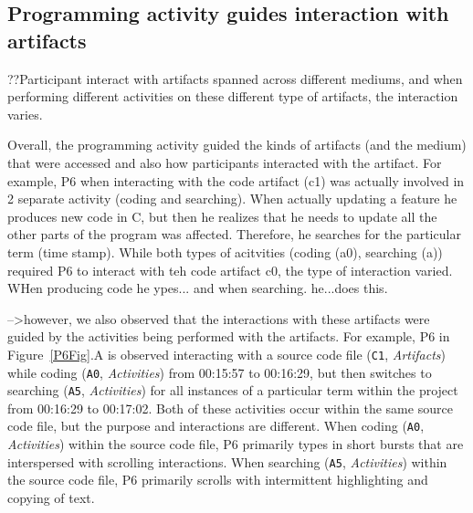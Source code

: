 
\subsection{Programming activity guides interaction with artifacts}


??Participant interact with artifacts spanned across different mediums, and when performing different activities on these different type of artifacts, the interaction varies.

Overall, the programming activity guided the kinds of artifacts (and the medium) that were accessed and also how participants interacted with the artifact. For example, P6 when interacting with the code artifact (c1) was actually involved in 2 separate activity (coding and searching). When actually updating a feature he produces new code in C, but then he realizes that he needs to update all the other parts of the program was affected. Therefore, he searches for the particular term (time stamp). While both types of acitvities (coding (a0), searching (a)) required P6 to interact with teh code artifact c0, the type of interaction varied. WHen producing code he ypes... and when searching. he...does this.

-->however, we also observed that the interactions with these artifacts were guided by the activities being performed with the artifacts. For example, P6 in Figure~\ref{P6Fig}.A is observed interacting with a source code file (\texttt{C1}, \textit{Artifacts}) while coding (\texttt{A0}, \textit{Activities}) from 00:15:57 to 00:16:29, but then switches to searching (\texttt{A5}, \textit{Activities}) for all instances of a particular term within the project from 00:16:29 to 00:17:02. Both of these activities occur within the same source code file, but the purpose and interactions are different. When coding (\texttt{A0}, \textit{Activities}) within the source code file, P6 primarily types in short bursts that are interspersed with scrolling interactions. When searching (\texttt{A5}, \textit{Activities}) within the source code file, P6 primarily scrolls with intermittent highlighting and copying of text.

